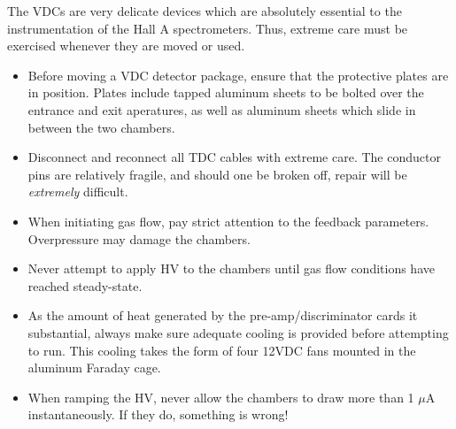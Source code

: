 {The VDCs are very delicate devices which are absolutely essential to
the instrumentation of the Hall A spectrometers.  Thus, extreme care
must be exercised whenever they are moved or used.

\begin{itemize}
\item{Before moving a VDC detector package, ensure that the protective
plates are in position.  Plates include tapped aluminum sheets to
be bolted over the entrance and exit aperatures, as well as aluminum
sheets which slide in between the two chambers.}
\item{Disconnect and reconnect all TDC cables with extreme care.  The
conductor pins are relatively fragile, and should one be broken off,
repair will be {\it extremely} difficult.}
\item{When initiating gas flow, pay strict attention to the feedback
parameters.  Overpressure may damage the chambers.}
\item{Never attempt to apply HV to the chambers until gas flow
conditions have reached steady-state.}
\item{As the amount of heat generated by the pre-amp/discriminator
cards it substantial, always make sure adequate cooling is provided
before attempting to run.  This cooling takes the form of
four 12VDC fans mounted in the aluminum Faraday cage.}
\item{When ramping the HV, never allow the chambers to draw more than
1 $\mu$A instantaneously.  If they do, something is wrong!}
\end{itemize}
}


